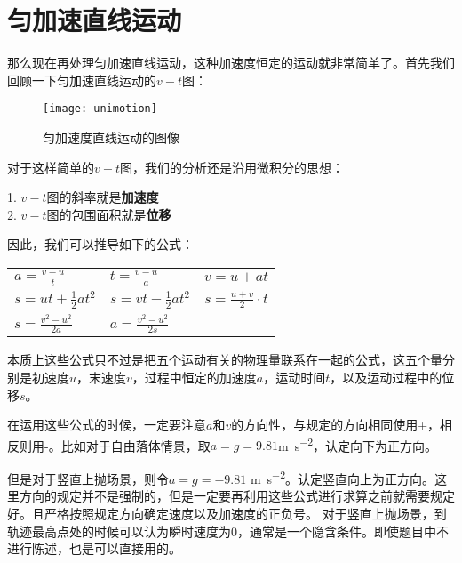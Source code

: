 \section{匀加速直线运动}
\label{sec:Constant Acceleration in a Straight Line}
那么现在再处理匀加速直线运动，这种加速度恒定的运动就非常简单了。首先我们回顾一下匀加速直线运动的$v-t$图：
\begin{figure}[H]
\centering
\texttt{[image: unimotion]}
\caption{匀加速度直线运动的图像}
\end{figure}

对于这样简单的$v-t$图，我们的分析还是沿用微积分的思想：
\begin{SummBox}
1. $v-t$图的斜率就是\textbf{加速度}\\
2. $v-t$图的包围面积就是\textbf{位移}
\end{SummBox}

因此，我们可以推导如下的公式：
\begin{table}[H]
\centering
\begin{tabular}{p{}p{}p{}}
$a=\frac{v-u}{t}$      & $t=\frac{v-u}{a}$      & $v=u+at$                 \\ 
$s=ut+\frac{1}{2}at^2$ & $s=vt-\frac{1}{2}at^2$   & $s=\frac{u+v}{2}\cdot t$ \\ 
$s=\frac{v^2-u^2}{2a}$ & $a=\frac{v^2-u^2}{2s}$ &                           
\end{tabular}
\end{table}

本质上这些公式只不过是把五个运动有关的物理量联系在一起的公式，这五个量分别是初速度$u$，末速度$v$，过程中恒定的加速度$a$，运动时间$t$，以及运动过程中的位移$s$。

在运用这些公式的时候，一定要注意$a$和$v$的方向性，与规定的方向相同使用+，相反则用-。比如对于自由落体情景，取$a=g=9.81$\si{\m\per\square \s}，认定向下为正方向。

但是对于竖直上抛场景，则令$a=g=-9.81$ \si{\m\per\square \s}。认定竖直向上为正方向。这里方向的规定并不是强制的，但是一定要再利用这些公式进行求算之前就需要规定好。且严格按照规定方向确定速度以及加速度的正负号。
对于竖直上抛场景，到\textcolor{r1}{轨迹最高点}处的时候可以认为\textcolor{r1}{瞬时速度为0}，通常是一个隐含条件。即使题目中不进行陈述，也是可以直接用的。

